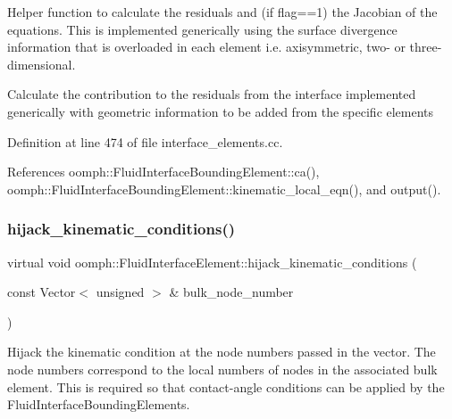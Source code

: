 Helper function to calculate the residuals and (if flag==1) the Jacobian of the equations. This is implemented generically using the surface divergence information that is overloaded in each element i.\+e. axisymmetric, two-\/ or three-\/dimensional. 

Calculate the contribution to the residuals from the interface implemented generically with geometric information to be added from the specific elements 

Definition at line 474 of file interface\+\_\+elements.\+cc.



References oomph\+::\+Fluid\+Interface\+Bounding\+Element\+::ca(), oomph\+::\+Fluid\+Interface\+Bounding\+Element\+::kinematic\+\_\+local\+\_\+eqn(), and output().

\mbox{\label{classoomph_1_1FluidInterfaceElement_a7eb949642baee233779e4f92478ea341}} 
\subsubsection{\texorpdfstring{hijack\+\_\+kinematic\+\_\+conditions()}{hijack\_kinematic\_conditions()}}
{\footnotesize\ttfamily virtual void oomph\+::\+Fluid\+Interface\+Element\+::hijack\+\_\+kinematic\+\_\+conditions (\begin{DoxyParamCaption}\item[{const Vector$<$ unsigned $>$ \&}]{bulk\+\_\+node\+\_\+number }\end{DoxyParamCaption})\hspace{0.3cm}{\ttfamily [pure virtual]}}



Hijack the kinematic condition at the node numbers passed in the vector. The node numbers correspond to the local numbers of nodes in the associated bulk element. This is required so that contact-\/angle conditions can be applied by the Fluid\+Interface\+Bounding\+Elements. 



